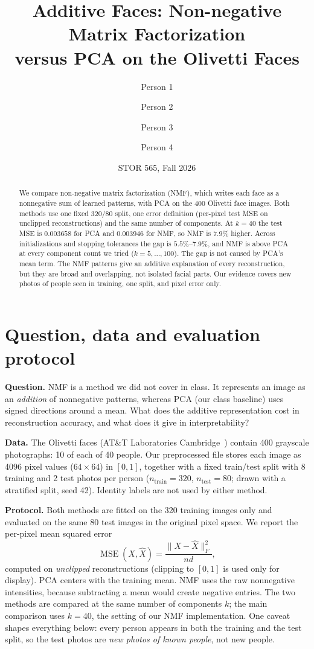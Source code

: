 \documentclass[10pt]{article}
\title{\vspace{-1.2em}\textbf{Additive Faces: Non-negative Matrix Factorization\\ versus PCA on the Olivetti Faces}\vspace{-0.2em}}
\author{Person 1 \and Person 2 \and Person 3 \and Person 4}
\date{STOR 565, Fall 2026}
\newcommand{\MSE}{\operatorname{MSE}}
\begin{document}
\maketitle
\vspace{-1.8em}

\begin{abstract}\small
We compare non-negative matrix factorization (NMF), which writes each face as a nonnegative sum of learned patterns, with PCA on the 400 Olivetti face images. Both methods use one fixed 320/80 split, one error definition (per-pixel test MSE on unclipped reconstructions) and the same number of components. At $k=40$ the test MSE is $0.003658$ for PCA and $0.003946$ for NMF, so NMF is $7.9\%$ higher. Across initializations and stopping tolerances the gap is $5.5\%$--$7.9\%$, and NMF is above PCA at every component count we tried ($k=5,\dots,100$). The gap is not caused by PCA's mean term. The NMF patterns give an additive explanation of every reconstruction, but they are broad and overlapping, not isolated facial parts. Our evidence covers new photos of people seen in training, one split, and pixel error only.
\end{abstract}

\section{Question, data and evaluation protocol}
\textbf{Question.} NMF is a method we did not cover in class. It represents an image as an \emph{addition} of nonnegative patterns, whereas PCA (our class baseline) uses signed directions around a mean. What does the additive representation cost in reconstruction accuracy, and what does it give in interpretability?

\textbf{Data.} The Olivetti faces (AT\&T Laboratories Cambridge~\cite{samaria1994}) contain 400 grayscale photographs: 10 of each of 40 people. Our preprocessed file stores each image as 4096 pixel values ($64\times64$) in $[0,1]$, together with a fixed train/test split with 8 training and 2 test photos per person ($n_{\text{train}}=320$, $n_{\text{test}}=80$; drawn with a stratified split, seed 42). Identity labels are not used by either method.

\textbf{Protocol.} Both methods are fitted on the 320 training images only and evaluated on the same 80 test images in the original pixel space. We report the per-pixel mean squared error
\[
\MSE(X,\hat X)=\frac{\|X-\hat X\|_F^2}{nd},
\]
computed on \emph{unclipped} reconstructions (clipping to $[0,1]$ is used only for display). PCA centers with the training mean. NMF uses the raw nonnegative intensities, because subtracting a mean would create negative entries. The two methods are compared at the same number of components $k$; the main comparison uses $k=40$, the setting of our NMF implementation. One caveat shapes everything below: every person appears in both the training and the test split, so the test photos are \emph{new photos of known people}, not new people.
\end{document}
